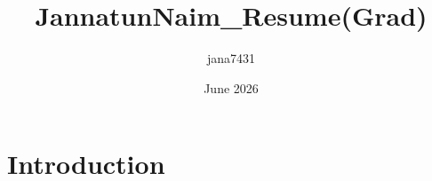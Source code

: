 \documentclass{article}
\title{JannatunNaim_Resume(Grad)}
\author{jana7431 }
\date{June 2026}
\begin{document}
\maketitle

\section{Introduction}
\end{document}
